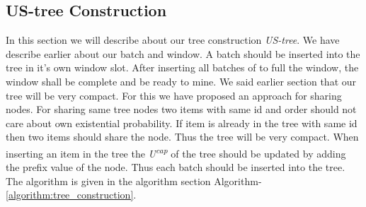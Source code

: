     \subsection{US-tree Construction}
    In this section we will describe about our tree construction \emph{US-tree}. We have describe earlier about our batch and window. A batch should be inserted into the tree in it's own window slot. After inserting all batches of to full the window, the window shall be complete and be ready to mine. We said earlier section that our tree will be very compact. For this we have proposed an approach for sharing nodes. For sharing same tree nodes two items with same id and order should not care about own existential probability. If item is already in the tree with same id then two items should share the node. Thus the tree will be very compact. When inserting an item in the tree the \emph{U\textsuperscript{cap}}  of the tree should be updated by adding the prefix value of the node. Thus each batch should be inserted into the tree. The algorithm is given in the algorithm section Algorithm-\ref{algorithm:tree_construction}.
    
